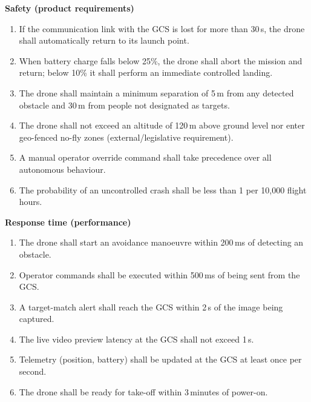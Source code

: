 \documentclass[11pt,a4paper]{article}
\begin{document}
\smallskip\noindent\textbf{Safety (product requirements)}
\begin{enumerate}[label=NFR-S\arabic*,leftmargin=*]
  \item If the communication link with the GCS is lost for more than 30\,s, the drone shall automatically return to its launch point.
  \item When battery charge falls below 25\%, the drone shall abort the mission and return; below 10\% it shall perform an immediate controlled landing.
  \item The drone shall maintain a minimum separation of 5\,m from any detected obstacle and 30\,m from people not designated as targets.
  \item The drone shall not exceed an altitude of 120\,m above ground level nor enter geo-fenced no-fly zones (external/legislative requirement).
  \item A manual operator override command shall take precedence over all autonomous behaviour.
  \item The probability of an uncontrolled crash shall be less than 1 per 10{,}000 flight hours.
\end{enumerate}

\noindent\textbf{Response time (performance)}
\begin{enumerate}[label=NFR-R\arabic*,leftmargin=*]
  \item The drone shall start an avoidance manoeuvre within 200\,ms of detecting an obstacle.
  \item Operator commands shall be executed within 500\,ms of being sent from the GCS.
  \item A target-match alert shall reach the GCS within 2\,s of the image being captured.
  \item The live video preview latency at the GCS shall not exceed 1\,s.
  \item Telemetry (position, battery) shall be updated at the GCS at least once per second.
  \item The drone shall be ready for take-off within 3\,minutes of power-on.
\end{enumerate}

\end{document}
